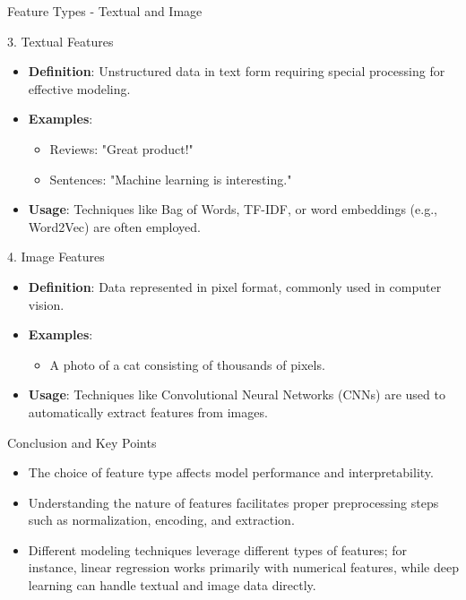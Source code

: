 \documentclass[aspectratio=169]{beamer}
\begin{document}
\begin{frame}[fragile]{Feature Types - Textual and Image}
    \begin{block}{3. Textual Features}
        \begin{itemize}
            \item \textbf{Definition}: Unstructured data in text form requiring special processing for effective modeling.
            \item \textbf{Examples}:
                \begin{itemize}
                    \item Reviews: "Great product!"
                    \item Sentences: "Machine learning is interesting."
                \end{itemize}
            \item \textbf{Usage}: Techniques like Bag of Words, TF-IDF, or word embeddings (e.g., Word2Vec) are often employed.
        \end{itemize}
    \end{block}
    
    \begin{block}{4. Image Features}
        \begin{itemize}
            \item \textbf{Definition}: Data represented in pixel format, commonly used in computer vision.
            \item \textbf{Examples}:
                \begin{itemize}
                    \item A photo of a cat consisting of thousands of pixels.
                \end{itemize}
            \item \textbf{Usage}: Techniques like Convolutional Neural Networks (CNNs) are used to automatically extract features from images.
        \end{itemize}
    \end{block}
\end{frame}

\begin{frame}[fragile]{Conclusion and Key Points}
    \begin{itemize}
        \item The choice of feature type affects model performance and interpretability.
        \item Understanding the nature of features facilitates proper preprocessing steps such as normalization, encoding, and extraction.
        \item Different modeling techniques leverage different types of features; for instance, linear regression works primarily with numerical features, while deep learning can handle textual and image data directly.
    \end{itemize}
\end{frame}
\end{document}
